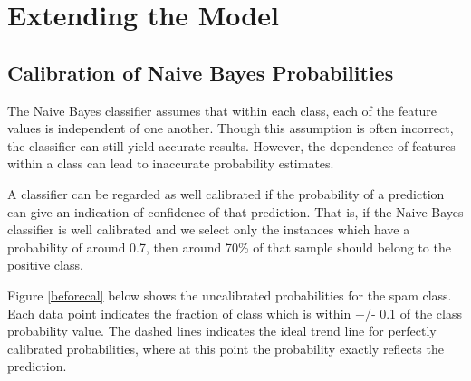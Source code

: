 \documentclass[12pt, a4paper]{article}
\begin{document}
  \section{Extending the Model}

  \subsection{Calibration of Naive Bayes Probabilities}

	The Naive Bayes classifier assumes that within each class, each of the feature values is independent of one another. Though this assumption is often incorrect, the classifier can still yield accurate results. However, the dependence of features within a class can lead to inaccurate probability estimates.

	A classifier can be regarded as well calibrated if the probability of a prediction can give an indication of confidence of that prediction.  That is, if the Naive Bayes classifier is well calibrated and we select only the instances which have a probability of around 0.7, then around 70\% of that sample should belong to the positive class.

	Figure \ref{beforecal} below shows the uncalibrated probabilities for the spam class. Each data point indicates the fraction of class which is within +/- 0.1 of the class probability value. The dashed lines indicates the ideal trend line for perfectly calibrated probabilities, where at this point the probability exactly reflects the prediction.
\end{document}
